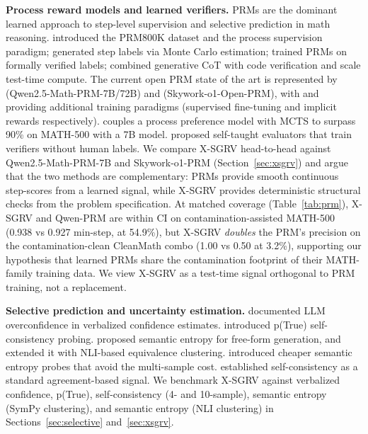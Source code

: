 \documentclass{article}
\begin{document}
\textbf{Process reward models and learned verifiers.} PRMs are the dominant learned approach to step-level supervision and selective prediction in math reasoning. \citet{lightman2024prm} introduced the PRM800K dataset and the process supervision paradigm; \citet{mathshepherd2024} generated step labels via Monte Carlo estimation; \citet{fover2025} trained PRMs on formally verified labels; \citet{genprm2025} combined generative CoT with code verification and scale test-time compute. The current open PRM state of the art is represented by \citet{qwenprm2025} (Qwen2.5-Math-PRM-7B/72B) and \citet{skyworkprm2024} (Skywork-o1-Open-PRM), with \citet{acemath2024} and \citet{prime2025} providing additional training paradigms (supervised fine-tuning and implicit rewards respectively). \citet{rstarmath2025} couples a process preference model with MCTS to surpass 90\% on MATH-500 with a 7B model. \citet{ste2024} proposed self-taught evaluators that train verifiers without human labels. We compare X-SGRV head-to-head against Qwen2.5-Math-PRM-7B and Skywork-o1-PRM (Section~\ref{sec:xsgrv}) and argue that the two methods are complementary: PRMs provide smooth continuous step-scores from a learned signal, while X-SGRV provides deterministic structural checks from the problem specification. At matched coverage (Table~\ref{tab:prm}), X-SGRV and Qwen-PRM are within CI on contamination-assisted MATH-500 (0.938 vs 0.927 min-step, at 54.9\%), but X-SGRV \emph{doubles} the PRM's precision on the contamination-clean CleanMath combo (1.00 vs 0.50 at 3.2\%), supporting our hypothesis that learned PRMs share the contamination footprint of their MATH-family training data. We view X-SGRV as a test-time signal orthogonal to PRM training, not a replacement.

\textbf{Selective prediction and uncertainty estimation.} \citet{xiong2024llmuncertainty} documented LLM overconfidence in verbalized confidence estimates. \citet{kadavath2022} introduced p(True) self-consistency probing. \citet{kuhn2023semantic} proposed semantic entropy for free-form generation, and \citet{farquhar2024nature} extended it with NLI-based equivalence clustering. \citet{seprobes2024} introduced cheaper semantic entropy probes that avoid the multi-sample cost. \citet{wang2023selfconsistency} established self-consistency as a standard agreement-based signal. We benchmark X-SGRV against verbalized confidence, p(True), self-consistency (4- and 10-sample), semantic entropy (SymPy clustering), and semantic entropy (NLI clustering) in Sections~\ref{sec:selective} and~\ref{sec:xsgrv}.
\end{document}
